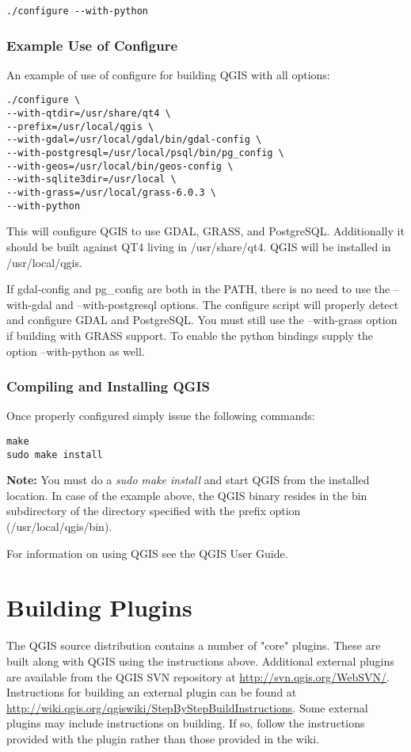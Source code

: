 \begin{verbatim}
./configure --with-python
\end{verbatim}

\subsubsection{Example Use of Configure}
  
An example of use of configure for building QGIS with all options:
  
\begin{verbatim}
./configure \
--with-qtdir=/usr/share/qt4 \
--prefix=/usr/local/qgis \
--with-gdal=/usr/local/gdal/bin/gdal-config \
--with-postgresql=/usr/local/psql/bin/pg_config \
--with-geos=/usr/local/bin/geos-config \
--with-sqlite3dir=/usr/local \
--with-grass=/usr/local/grass-6.0.3 \
--with-python 
\end{verbatim}
  
This will configure QGIS to use GDAL, GRASS, and PostgreSQL. Additionally it should
be built against QT4 living in /usr/share/qt4.
QGIS will be installed in /usr/local/qgis.

If gdal-config and pg\_config are both in the PATH, there
is no need to use the --with-gdal and --with-postgresql options. The configure
script will properly detect and configure GDAL and PostgreSQL. You must
still use the --with-grass option if building with GRASS support. To enable the
python bindings supply the option --with-python as well.
  
\subsubsection{Compiling and Installing QGIS}
  
Once properly configured simply issue the following commands:
  
\begin{verbatim}
make
sudo make install
\end{verbatim}

\textbf{Note:} You must do a \textit{sudo make install} and start QGIS from the
installed location. In case of the example above, the QGIS binary
resides in the bin subdirectory of the directory specified with the prefix
option (/usr/local/qgis/bin).

For information on using QGIS see the QGIS User Guide.

\section{Building Plugins}

The QGIS source distribution contains a number of "core" plugins. These are
built along with QGIS using the instructions above. Additional external
plugins are available from the QGIS SVN repository at
\url{http://svn.qgis.org/WebSVN/}. 
Instructions for building an external
plugin can be found at
\url{http://wiki.qgis.org/qgiswiki/StepByStepBuildInstructions}.
Some external plugins may include instructions on building. If so, follow
the instructions provided with the plugin rather than those provided in the
wiki. 
